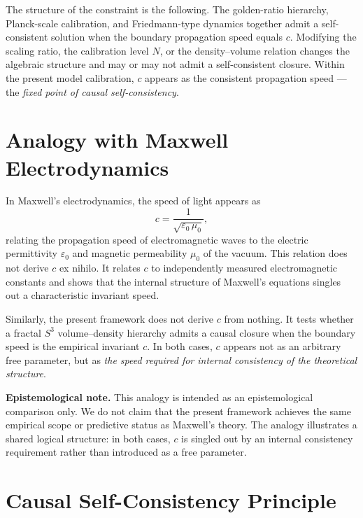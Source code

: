 \documentclass[11pt,a4paper]{article}
\begin{document}
\medskip
The structure of the constraint is the following. The golden-ratio hierarchy,
Planck-scale calibration, and Friedmann-type dynamics together admit a
self-consistent solution when the boundary propagation speed equals $c$. Modifying
the scaling ratio, the calibration level $N$, or the density--volume relation
changes the algebraic structure and may or may not admit a self-consistent closure.
Within the present model calibration, $c$ appears as the consistent propagation
speed — the \emph{fixed point of causal self-consistency}.

\section{Analogy with Maxwell Electrodynamics}

In Maxwell's electrodynamics, the speed of light appears as
\[
  c = \frac{1}{\sqrt{\varepsilon_0\,\mu_0}},
\]
relating the propagation speed of electromagnetic waves to the electric permittivity
$\varepsilon_0$ and magnetic permeability $\mu_0$ of the vacuum. This relation does
not derive $c$ ex nihilo. It relates $c$ to independently measured electromagnetic
constants and shows that the internal structure of Maxwell's equations singles out a
characteristic invariant speed.

Similarly, the present framework does not derive $c$ from nothing. It tests whether
a fractal $S^3$ volume--density hierarchy admits a causal closure when the boundary
speed is the empirical invariant $c$. In both cases, $c$ appears not as an arbitrary
free parameter, but as \emph{the speed required for internal consistency of the
theoretical structure}.

\medskip
\begin{notebox}
\textbf{Epistemological note.}\quad
This analogy is intended as an epistemological comparison only. We do not claim that
the present framework achieves the same empirical scope or predictive status as
Maxwell's theory. The analogy illustrates a shared logical structure: in both cases,
$c$ is singled out by an internal consistency requirement rather than introduced
as a free parameter.
\end{notebox}

\section{Causal Self-Consistency Principle}
\end{document}
